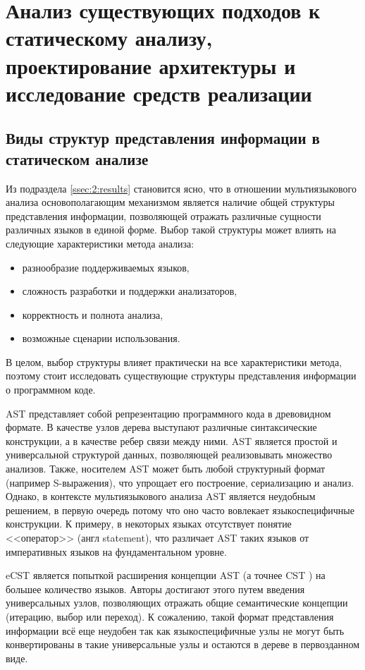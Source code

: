 \chapter{Анализ существующих подходов к статическому анализу, проектирование архитектуры и
исследование средств реализации}

\section{Виды структур представления информации в статическом анализе}

Из подраздела \ref{ssec:2:results} становится ясно, что в отношении мультиязыкового анализа
основополагающим механизмом является наличие общей структуры представления информации, позволяющей отражать различные
сущности различных языков в единой форме. Выбор такой структуры может влиять на следующие
характеристики метода анализа:
\begin{itemize}
    \item разнообразие поддерживаемых языков,
    \item сложность разработки и поддержки анализаторов,
    \item корректность и полнота анализа,
    \item возможные сценарии использования.
\end{itemize}
В целом, выбор структуры влияет практически на все характеристики метода, поэтому стоит
исследовать существующие структуры представления информации о программном коде.

AST 
 представляет собой репрезентацию программного кода в древовидном формате. В качестве узлов дерева выступают различные синтаксические конструкции, а в качестве ребер связи между ними. AST является
простой и универсальной структурой данных, позволяющей реализовывать множество анализов. Также,
носителем AST может быть любой структурный формат (например S-выражения), что упрощает его
построение, сериализацию и анализ. Однако, в контексте мультиязыкового анализа AST является
неудобным решением, в первую очередь потому что оно часто вовлекает языкоспецифичные конструкции.
К примеру, в некоторых языках отсутствует понятие <<оператор>> (англ statement), что различает
AST таких языков от императивных языков на фундаментальном уровне.

eCST \cite{eCST} является попыткой расширения концепции AST (а точнее CST ) на большее
количество языков. Авторы достигают этого путем введения универсальных узлов, позволяющих
отражать общие семантические концепции (итерацию, выбор или переход). К сожалению, такой формат
представления информации всё еще неудобен так как языкоспецифичные узлы не могут быть конвертированы
в такие универсальные узлы и остаются в дереве в первозданном виде.

